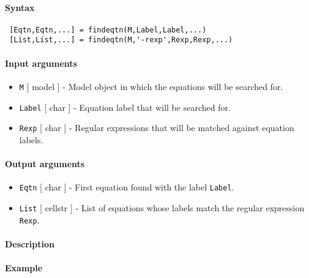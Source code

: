 


	\paragraph{Syntax}
 
 \begin{verbatim}
 [Eqtn,Eqtn,...] = findeqtn(M,Label,Label,...)
 [List,List,...] = findeqtn(M,'-rexp',Rexp,Rexp,...)
 \end{verbatim}
 
 \paragraph{Input arguments}
 
 \begin{itemize}
 \item
   \texttt{M} {[} model {]} - Model object in which the equations will be
   searched for.
 \item
   \texttt{Label} {[} char {]} - Equation label that will be searched
   for.
 \item
   \texttt{Rexp} {[} char {]} - Regular expressions that will be matched
   against equation labels.
 \end{itemize}
 
 \paragraph{Output arguments}
 
 \begin{itemize}
 \item
   \texttt{Eqtn} {[} char {]} - First equation found with the label
   \texttt{Label}.
 \item
   \texttt{List} {[} cellstr {]} - List of equations whose labels match
   the regular expression \texttt{Rexp}.
 \end{itemize}
 
 \paragraph{Description}
 
 \paragraph{Example}


